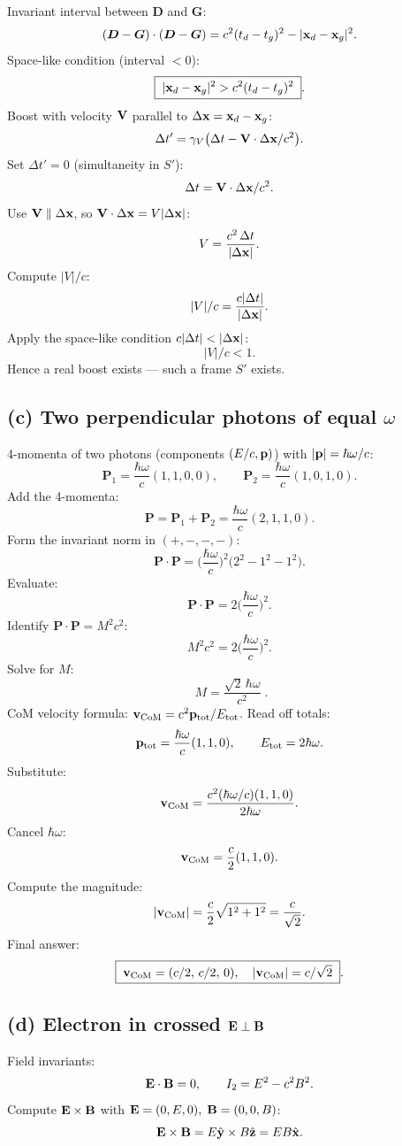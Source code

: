 \documentclass[11pt]{article}
\begin{document}
Invariant interval between $\bm D$ and $\bm G$:
\[
(\bm D-\bm G)\cdot(\bm D-\bm G) = c^2(t_d-t_g)^2 - |\vb x_d-\vb x_g|^2.
\]
Space-like condition (interval $<0$):
\[
\boxed{\;|\vb x_d-\vb x_g|^2 > c^2(t_d-t_g)^2\;}.
\]
Boost with velocity $\vb V$ parallel to $\Delta\vb x = \vb x_d-\vb x_g$:
\[
\Delta t' = \gamma_V\bigl(\Delta t - \vb V\cdot\Delta\vb x/c^2\bigr).
\]
Set $\Delta t'=0$ (simultaneity in $S'$):
\[
\Delta t = \vb V\cdot\Delta\vb x/c^2.
\]
Use $\vb V\parallel\Delta\vb x$, so $\vb V\cdot\Delta\vb x = V|\Delta\vb x|$:
\[
V = \frac{c^2\,\Delta t}{|\Delta\vb x|}.
\]
Compute $|V|/c$:
\[
|V|/c = \frac{c|\Delta t|}{|\Delta\vb x|}.
\]
Apply the space-like condition $c|\Delta t|<|\Delta\vb x|$:
\[
|V|/c < 1.
\]
Hence a real boost exists --- such a frame $S'$ exists.

\subsection*{(c) Two perpendicular photons of equal $\omega$}

4-momenta of two photons (components $(E/c,\vb p)$) with $|\vb p|=\hbar\omega/c$:
\[
\bm P_1 = \frac{\hbar\omega}{c}(1,1,0,0),\qquad \bm P_2 = \frac{\hbar\omega}{c}(1,0,1,0).
\]
Add the 4-momenta:
\[
\bm P = \bm P_1+\bm P_2 = \frac{\hbar\omega}{c}(2,1,1,0).
\]
Form the invariant norm in $(+,-,-,-)$:
\[
\bm P\cdot\bm P = \biggl(\frac{\hbar\omega}{c}\biggr)^2\bigl(2^2 - 1^2 - 1^2\bigr).
\]
Evaluate:
\[
\bm P\cdot\bm P = 2\biggl(\frac{\hbar\omega}{c}\biggr)^2.
\]
Identify $\bm P\cdot\bm P = M^2 c^2$:
\[
M^2 c^2 = 2\biggl(\frac{\hbar\omega}{c}\biggr)^2.
\]
Solve for $M$:
\[
\boxed{\;M = \frac{\sqrt{2}\,\hbar\omega}{c^2}\;}.
\]
CoM velocity formula: $\vb v_\text{CoM} = c^2\vb p_\text{tot}/E_\text{tot}$. Read off totals:
\[
\vb p_\text{tot} = \frac{\hbar\omega}{c}(1,1,0),\qquad E_\text{tot} = 2\hbar\omega.
\]
Substitute:
\[
\vb v_\text{CoM} = \frac{c^2(\hbar\omega/c)(1,1,0)}{2\hbar\omega}.
\]
Cancel $\hbar\omega$:
\[
\vb v_\text{CoM} = \frac{c}{2}(1,1,0).
\]
Compute the magnitude:
\[
|\vb v_\text{CoM}| = \frac{c}{2}\sqrt{1^2+1^2} = \frac{c}{\sqrt 2}.
\]
Final answer:
\[
\boxed{\;\vb v_\text{CoM} = (c/2,\,c/2,\,0),\quad|\vb v_\text{CoM}|=c/\sqrt{2}\;}.
\]

\subsection*{(d) Electron in crossed $\vb E\perp\vb B$}

Field invariants:
\[
\vb E\cdot\vb B = 0,\qquad I_2 = E^2 - c^2 B^2.
\]
Compute $\vb E\times\vb B$ with $\vb E=(0,E,0),\;\vb B=(0,0,B)$:
\[
\vb E\times\vb B = E\hat{\vb y}\times B\hat{\vb z} = EB\hat{\vb x}.
\]
\end{document}

